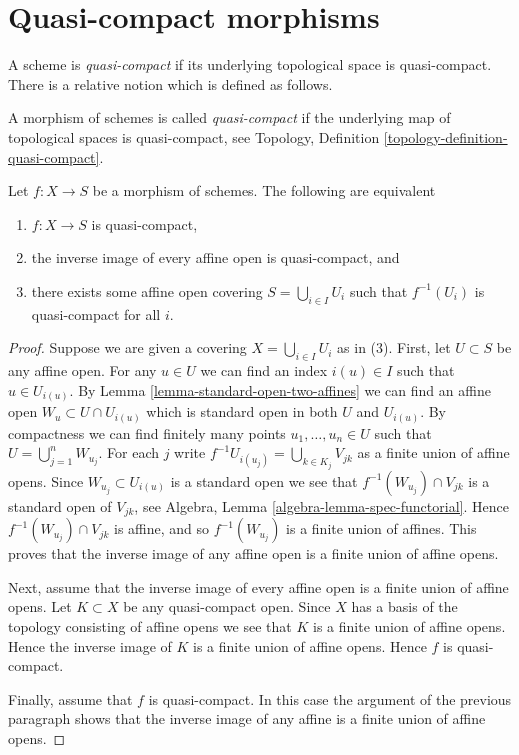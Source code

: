 \section{Quasi-compact morphisms}
\label{section-quasi-compact}

\noindent
A scheme is {\it quasi-compact} if its underlying topological space is
quasi-compact. There is a relative notion which is defined as follows.

\begin{definition}
\label{definition-quasi-compact}
A morphism of schemes is called {\it quasi-compact}
if the underlying map of topological spaces is
quasi-compact, see
Topology, Definition \ref{topology-definition-quasi-compact}.
\end{definition}

\begin{lemma}
\label{lemma-quasi-compact-affine}
Let $f : X \to S$ be a morphism of schemes.
The following are equivalent
\begin{enumerate}
\item $f : X \to S$ is quasi-compact,
\item the inverse image of every affine open is quasi-compact, and
\item there exists some affine open covering $S = \bigcup_{i \in I} U_i$
such that $f^{-1}(U_i)$ is quasi-compact for all $i$.
\end{enumerate}
\end{lemma}

\begin{proof}
Suppose we are given a covering $X = \bigcup_{i \in I} U_i$ as in (3).
First, let $U \subset S$ be any affine open. For any $u \in U$
we can find an index $i(u) \in I$ such that $u \in U_{i(u)}$.
By Lemma \ref{lemma-standard-open-two-affines} we can find
an affine open $W_u \subset U \cap U_{i(u)}$
which is standard open in both $U$ and $U_{i(u)}$.
By compactness we can find finitely many points $u_1, \ldots, u_n \in U$
such that $U = \bigcup_{j = 1}^n W_{u_j}$. For each $j$ write
$f^{-1}U_{i(u_j)} = \bigcup_{k \in K_j} V_{jk}$ as a finite
union of affine opens. Since $W_{u_j} \subset U_{i(u)}$ is a standard
open we see that $f^{-1}(W_{u_j}) \cap V_{jk}$ is a standard
open of $V_{jk}$, see Algebra, Lemma \ref{algebra-lemma-spec-functorial}.
Hence $f^{-1}(W_{u_j}) \cap V_{jk}$ is affine, and so
$f^{-1}(W_{u_j})$ is a finite union of affines. This proves that the
inverse image of any affine open is a finite union of affine opens.

\medskip\noindent
Next, assume that the inverse image of every affine open is a finite
union of affine opens.
Let $K \subset X$ be any quasi-compact open. Since $X$ has a basis
of the topology consisting of affine opens we see that $K$ is a finite
union of affine opens. Hence the inverse image of $K$ is a finite
union of affine opens. Hence $f$ is quasi-compact.

\medskip\noindent
Finally, assume that $f$ is quasi-compact. In this case the argument
of the previous paragraph shows that the inverse image of any affine
is a finite union of affine opens.
\end{proof}

